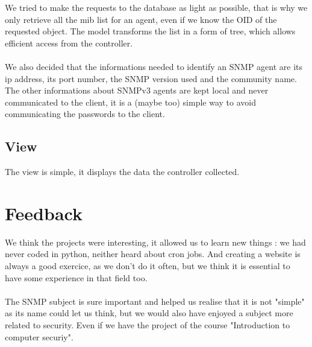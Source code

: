 \documentclass[a4paper,titlepage]{article}
\begin{document}
We tried to make the requests to the database as light as possible, that is why we only retrieve all the mib list for an agent, even if we know the OID of the requested object. The model transforms the list in a form of tree, which allows efficient access from the controller. \\ \\

We also decided that the informations needed to identify an SNMP agent are its ip address, its port number, the SNMP version used and the community name. The other informations about SNMPv3 agents are kept local and never communicated to the client, it is a (maybe too) simple way to avoid communicating the passwords to the client. 


\subsection{View}
The view is simple, it displays the data the controller collected. 



\section{Feedback} 
We think the projects were interesting, it allowed us to learn new things : we had never coded in python, neither heard about cron jobs. And creating a website is always a good exercice, as we don't do it often, but we think it is essential to have some experience in that field too. \\ \\
The SNMP subject is sure important and helped us realise that it is not "simple" as its name could let us think, but we would also have enjoyed a subject more related to security. Even if we have the project of the course "Introduction to computer securiy".
\end{document}
